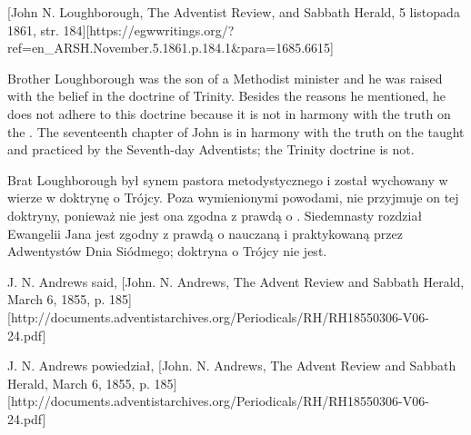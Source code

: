 [John N. Loughborough, The Adventist Review, and Sabbath Herald, 5 listopada 1861, str. 184][https://egwwritings.org/?ref=en\_ARSH.November.5.1861.p.184.1&para=1685.6615]


Brother Loughborough was the son of a Methodist minister and he was raised with the belief in the doctrine of Trinity. Besides the reasons he mentioned, he does not adhere to this doctrine because it is not in harmony with the truth on the . The seventeenth chapter of John is in harmony with the truth on the  taught and practiced by the Seventh-day Adventists; the Trinity doctrine is not.


Brat Loughborough był synem pastora metodystycznego i został wychowany w wierze w doktrynę o Trójcy. Poza wymienionymi powodami, nie przyjmuje on tej doktryny, ponieważ nie jest ona zgodna z prawdą o . Siedemnasty rozdział Ewangelii Jana jest zgodny z prawdą o  nauczaną i praktykowaną przez Adwentystów Dnia Siódmego; doktryna o Trójcy nie jest.


J. N. Andrews said, [John. N. Andrews, The Advent Review and Sabbath Herald, March 6, 1855, p. 185][http://documents.adventistarchives.org/Periodicals/RH/RH18550306-V06-24.pdf]


J. N. Andrews powiedział, [John. N. Andrews, The Advent Review and Sabbath Herald, March 6, 1855, p. 185][http://documents.adventistarchives.org/Periodicals/RH/RH18550306-V06-24.pdf]


